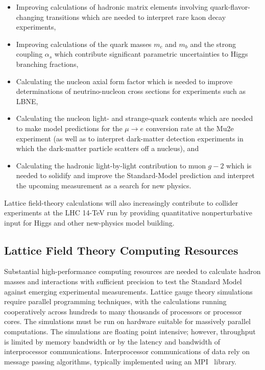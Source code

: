 \begin{itemize}

\item Improving calculations of hadronic matrix elements involving
quark-flavor-changing transitions which are needed to interpret rare kaon
decay experiments,

\item Improving calculations of the quark masses $m_c$ and $m_b$ and the
strong coupling $\alpha_s$ which contribute significant parametric
uncertainties to Higgs branching fractions,

\item Calculating the nucleon axial form factor which is needed to improve
determinations of neutrino-nucleon cross sections for experiments such as
LBNE,

\item Calculating the nucleon light- and strange-quark contents which are
needed to make model predictions for the $\mu \to e$ conversion rate at the
Mu2e experiment (as well as to interpret dark-matter detection experiments in
which the dark-matter particle scatters off a nucleus), and

\item Calculating the hadronic light-by-light contribution to muon $g-2$ which
is needed to solidify and improve the Standard-Model prediction and interpret
the upcoming measurement as a search for new physics.

\end{itemize}

Lattice field-theory calculations will also increasingly contribute to
collider experiments at the LHC 14-TeV run by providing quantitative
nonperturbative input for Higgs and other new-physics model building.

\subsection{Lattice Field Theory Computing Resources}

Substantial high-performance computing resources are needed to calculate
hadron masses and interactions with sufficient precision to test the Standard
Model against emerging experimental measurements.  Lattice gauge theory
simulations require parallel programming techniques, with the calculations
running cooperatively across hundreds to many thousands of processors or
processor cores.  The simulations must be run on hardware suitable for
massively parallel computations. The simulations are floating point intensive;
however, throughput is limited by memory bandwidth or by the latency and
bandwidth of interprocessor communications. Interprocessor communications of
data rely on message passing algorithms, typically implemented using an
MPI~\cite{MPI} library.

